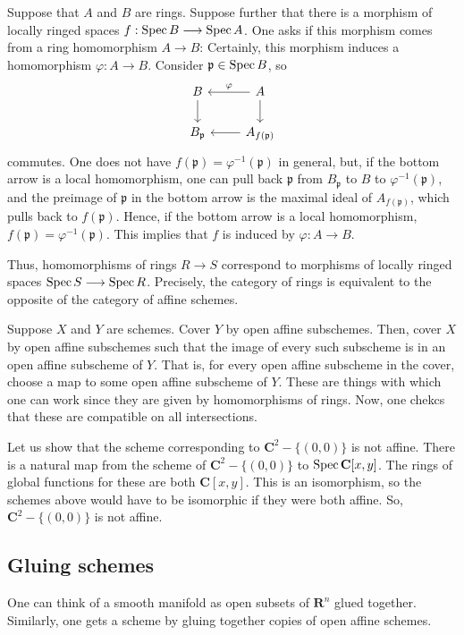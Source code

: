 \documentclass [11 pt, oneside, margin = 1 in] {article}
\begin{document}
Suppose that $A$ and $B$ are rings. Suppose further that there is a morphism of locally ringed spaces $f:\operatorname{Spec} B\longrightarrow \operatorname{Spec} A$. One asks if this morphism comes from a ring homomorphism $A\longrightarrow B$: Certainly, this morphism induces a homomorphism $\varphi : A\longrightarrow B$. Consider $\mathfrak{p}\in \operatorname{Spec} B$, so
\[
\begin{tikzcd}
	B \ar[d] & A \ar[l,"\varphi", swap] \ar[d] \\ B_{\mathfrak{p}} &A_{f(\mathfrak{p}) } \ar[l]
\end{tikzcd}
\]
commutes.
One does not have $f(\mathfrak{p}) = \varphi ^{-1}(\mathfrak{p})$ in general, but, if the bottom arrow is a local homomorphism, one can pull back $\mathfrak{p}$ from $B_{\mathfrak{p}}$ to $B$ to $\varphi^{-1}(\mathfrak{p})$, and the preimage of $\mathfrak{p}$ in the bottom arrow is the maximal ideal of $A_{f(\mathfrak{p}) }$, which pulls back to $f(\mathfrak{p})$. Hence, if the bottom arrow is a local homomorphism, $f(\mathfrak{p}) = \varphi^{-1}(\mathfrak{p})$. This implies that $f$ is induced by $\varphi : A\longrightarrow B$.

Thus, homomorphisms of rings $R\longrightarrow S$ correspond to morphisms of locally ringed spaces $\operatorname{Spec} S \longrightarrow \operatorname{Spec} R$. Precisely, the category of rings is equivalent to the opposite of the category of affine schemes.

Suppose $X$ and $Y$ are schemes. Cover $Y$ by open affine subschemes. Then, cover $X$ by open affine subschemes such that the image of every such subscheme is in an open affine subscheme of $Y$. That is, for every open affine subscheme in the cover, choose a map to some open affine subscheme of $Y$. These are things with which one can work since they are given by homomorphisms of rings. Now, one chekcs that these are compatible on all intersections.

\begin{example}[ ]\label{}\text{}
Let us show that the scheme corresponding to $\mathbf{C}^2 - \{(0,0)\}$ is not affine. There is a natural map from the scheme of $\mathbf{C}^2-\{(0,0)\}$ to $\operatorname{Spec} \mathbf{C}[x,y]$. The rings of global functions for these are both $\mathbf{C}[x,y]$. This is an isomorphism, so the schemes above would have to be isomorphic if they were both affine. So, $\mathbf{C}^2-\{(0,0)\}$ is not affine. 
\end{example}

\subsection{Gluing schemes}
One can think of a smooth manifold as open subsets of $\mathbf{R}^n$ glued together. Similarly, one gets a scheme by gluing together copies of open affine schemes.
\end{document}
